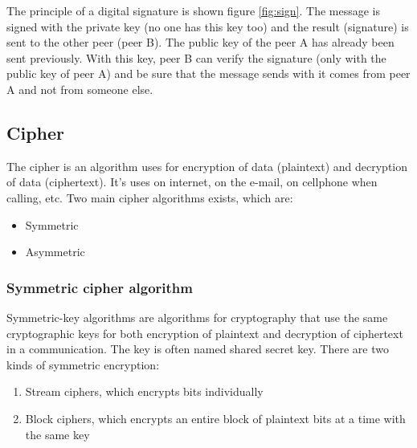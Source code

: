 The principle of a digital signature is shown figure \ref{fig:sign}.\newline
The message is signed with the private key (no one has this key too) and the
result (signature) is sent to the other peer (peer B).\newline
The public key of the peer A has already been sent previously. With this key, peer
B can verify the signature (only with the public key of peer A) and be sure that
the message sends with it comes from peer A and not from someone else.

\newpage

\subsection{Cipher}
 The cipher is an algorithm uses for encryption of data (plaintext) and
 decryption of data (ciphertext).\newline
 It's uses on internet, on the e-mail, on cellphone when calling, etc.\newline
 Two main cipher algorithms exists, which are:
 \begin{itemize}
   \item Symmetric
   \item Asymmetric
 \end{itemize}



\subsubsection{Symmetric cipher algorithm}
\label{intro_cipher}


Symmetric-key algorithms are algorithms for cryptography that use the same
cryptographic keys for both encryption of plaintext and decryption of
ciphertext in a communication.\newline
The key is often named shared secret key.\newline
There are two kinds of symmetric encryption:
\begin{enumerate}
  \item Stream ciphers, which encrypts bits individually
  \item Block ciphers, which encrypts an entire block of plaintext bits
  at a time with the same key\newline
\end{enumerate}


